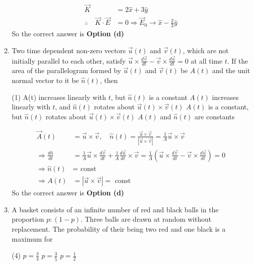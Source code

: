 \begin{enumerate}
\begin{answer}
	\begin{align*}
\vec{K}&=2 \hat{x}+3 \hat{y}\\
	\therefore\quad \vec{K} \cdot \vec{E}&=0 \Rightarrow \vec{E}_{0} \rightarrow \hat{x}-\frac{2}{3} \hat{y}
	\end{align*}
		So the correct answer is \textbf{Option (d)}
\end{answer}
\item Two time dependent non-zero vectors $\vec{u}(t)$ and $\vec{v}(t)$, which are not initially parallel to each other, satisfy $\vec{u} \times \frac{d \vec{v}}{d t}-\vec{v} \times \frac{d \vec{u}}{d t}=0$ at all time $t$. If the area of the parallelogram formed by $\vec{u}(t)$ and $\vec{v}(t)$ be $A(t)$ and the unit normal vector to it be $\hat{n}(t)$, then
 \begin{tasks}(1)
	\task[\textbf{a.}] A(t) increases linearly with $t$, but $\hat{n}(t)$ is a constant
	\task[\textbf{b.}] $A(t)$ increases linearly with $t$, and $\hat{n}(t)$ rotates about $\vec{u}(t) \times \vec{v}(t)$
	\task[\textbf{c.}]$A(t)$ is a constant, but $\hat{n}(t)$ rotates about $\vec{u}(t) \times \vec{v}(t)$
	\task[\textbf{d.}] $A(t)$ and $\hat{n}(t)$ are constants
\end{tasks}
\begin{answer}
	\begin{align*}
	 \vec{A}(t)&=\vec{u} \times \vec{v}, \quad \hat{n}(t)=\frac{\vec{u} \times \vec{v}}{|\vec{u} \times \vec{v}|}=\frac{1}{A} \vec{u} \times \vec{v}\\
	\Rightarrow \frac{d \hat{n}}{d t}&=\frac{1}{A} \vec{u} \times \frac{d \vec{v}}{d t}+\frac{1}{A} \frac{d \vec{u}}{d t} \times \vec{v}=\frac{1}{A}\left(\vec{u} \times \frac{d \vec{v}}{d t}-\vec{v} \times \frac{d \vec{u}}{d t}\right)=0 \\
	\Rightarrow \hat{n}(t)&=\text { const } \\
	\Rightarrow A(t)&=|\vec{u} \times \vec{v}|=\text { const }
	\end{align*}
		So the correct answer is \textbf{Option (d)}
\end{answer}
\item A basket consists of an infinite number of red and black balls in the proportion $p:(1-p)$. Three balls are drawn at random without replacement. The probability of their being two red and one black is a maximum for
 \begin{tasks}(4)
	\task[\textbf{a.}]$p=\frac{3}{4}$
	\task[\textbf{b.}]$p=\frac{3}{5}$
	\task[\textbf{c.}] $p=\frac{1}{2}$

\end{tasks}
\end{enumerate}
